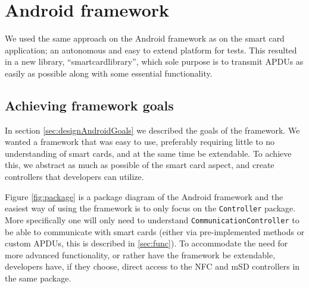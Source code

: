 \section{Android framework}
\label{sec:androidApp}
We used the same approach on the Android framework as on the smart card application; an autonomous and easy to extend platform for tests. This resulted in a new library, ``smartcardlibrary'',  which sole purpose is to transmit APDUs as easily as possible along with some essential functionality.

\subsection{Achieving framework goals}
In section \ref{sec:designAndroidGoals} we described the goals of the framework. We wanted a framework that was easy to use, preferably requiring little to no understanding of smart cards, and at the same time be extendable. To achieve this, we abstract as much as possible of the smart card aspect, and create controllers that developers can utilize.

Figure \ref{fig:package} is a package diagram of the Android framework and the easiest way of using the framework is to only focus on the \texttt{Controller} package. More specifically one will only need to understand \texttt{CommunicationController} to be able to communicate with smart cards (either via pre-implemented methods or custom APDUs, this is described in \ref{sec:func}). To accommodate the need for more advanced functionality, or rather have the framework be extendable, developers have, if they choose, direct access to the NFC and mSD controllers in the same package.

